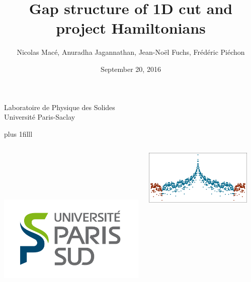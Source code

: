 \documentclass[xcolor=x11names,compress,professionalfonts]{beamer}
\newcommand{\btVFill}{\vskip0pt plus 1filll}%
\renewcommand{\(}{\begin{columns}}
\renewcommand{\)}{\end{columns}}
\newcommand{\<}[1]{\begin{column}{#1}}
\renewcommand{\>}{\end{column}}
\begin{document}
\begin{frame}
\title{{\fontsize{14}{60}\selectfont Gap structure of 1D cut and project Hamiltonians}}

\author{Nicolas Macé, Anuradha Jagannathan, Jean-Noël Fuchs, Frédéric Piéchon}

\institute %
{
  Laboratoire de Physique des Solides\\
  Université Paris-Saclay
}

\date{September 20, 2016}

\titlepage

\btVFill
\begin{columns}
\begin{column}{2cm}
~\\
~\\
~\\
~\\
\raggedright
\includegraphics[scale=.15]{img/LogoUPSUD.png}
\end{column}
\begin{column}{6cm}
\centering
\includegraphics[width=1.\textwidth]{img/cover_illustration.pdf}
\end{column}
\begin{column}{2cm}

\end{column}
\end{columns}
\end{frame}
\end{document}

